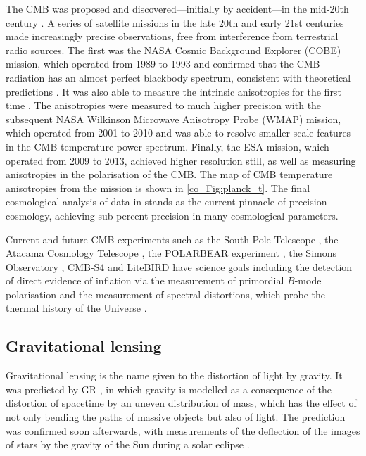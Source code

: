 The CMB was proposed and discovered---initially by accident---in the mid-20th century \citep{Gamow1948a, Gamow1948b, Alpher1948a, Alpher1948b, Doroshkevich1964, Penzias1965, Dicke1965}. A series of satellite missions in the late 20th and early 21st centuries made increasingly precise observations, free from interference from terrestrial radio sources. The first was the NASA Cosmic Background Explorer (COBE) mission, which operated from 1989 to 1993 and confirmed that the CMB radiation has an almost perfect blackbody spectrum, consistent with theoretical predictions \citep{Fixsen1996}. It was also able to measure the intrinsic anisotropies for the first time \citep{Bennett1996}. The anisotropies were measured to much higher precision with the subsequent NASA Wilkinson Microwave Anisotropy Probe (WMAP) mission, which operated from 2001 to 2010 and was able to resolve smaller scale features in the CMB temperature power spectrum. Finally, the ESA \Planck{} mission, which operated from 2009 to 2013, achieved higher resolution still, as well as measuring anisotropies in the polarisation of the CMB. The map of CMB temperature anisotropies from the \Planck{} mission is shown in \autoref{co_Fig:planck_t}. The final cosmological analysis of \Planck{} data in \citet{Planck2018VI} stands as the current pinnacle of precision cosmology, achieving sub-percent precision in many cosmological parameters.

Current and future CMB experiments such as the South Pole Telescope \citep{Carlstrom2011}, the Atacama Cosmology Telescope \citep{Swetz2011}, the POLARBEAR experiment \citep{Kermish2012}, the Simons Observatory \citep{so2019}, CMB-S4 \citep{Abazajian2016} and LiteBIRD \citep{Hazumi2019} have science goals including the detection of direct evidence of inflation via the measurement of primordial $B$-mode polarisation \citep{Kamionkowski2016} and the measurement of spectral distortions, which probe the thermal history of the Universe \citep{Chluba2019, Chluba2021}.

\subsection{Gravitational lensing}
\label{co_Sec:gravitational_lensing}

Gravitational lensing is the name given to the distortion of light by gravity. It was predicted by GR \citep{Einstein1916, Einstein1936}, in which gravity is modelled as a consequence of the distortion of spacetime by an uneven distribution of mass,
which has the effect of not only bending the paths of massive objects but also of light.
The prediction was confirmed soon afterwards, with measurements of the deflection of the images of stars by the gravity of the Sun during a solar eclipse \citep{Dyson1917, Dyson1920}.

